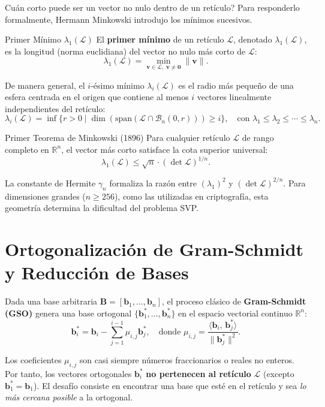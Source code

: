 \documentclass[11pt,a4paper,twoside,openright]{book}
\theoremstyle{plain}
\theoremstyle{definition}
\theoremstyle{remark}
\newcommand{\R}{\mathbb{R}}
\newcommand{\vv}[1]{\mathbf{#1}}
\newcommand{\mm}[1]{\mathbf{#1}}
\newcommand{\inner}[2]{\langle #1,\, #2 \rangle}
\begin{document}
\textquestiondown Cu\'an corto puede ser un vector no nulo dentro de un ret\'iculo? Para responderlo formalmente, Hermann Minkowski introdujo los m\'inimos sucesivos.

\begin{midef}{Primer M\'inimo $\lambda_1(\mathcal{L})$}
El \textbf{primer m\'inimo} de un ret\'iculo $\mathcal{L}$, denotado $\lambda_1(\mathcal{L})$, es la longitud (norma euclidiana) del vector no nulo m\'as corto de $\mathcal{L}$:
\[
  \lambda_1(\mathcal{L}) = \min_{\vv{v} \in \mathcal{L},\; \vv{v} \neq \vv{0}} \|\vv{v}\|.
\]
\end{midef}

De manera general, el $i$-\'esimo m\'inimo $\lambda_i(\mathcal{L})$ es el radio m\'as peque\~no de una esfera centrada en el origen que contiene al menos $i$ vectores linealmente independientes del ret\'iculo:
\[
  \lambda_i(\mathcal{L}) = \inf \{ r > 0 \mid \dim(\mathrm{span}(\mathcal{L} \cap \mathcal{B}_n(0, r))) \geq i \}, \quad \text{con } \lambda_1 \leq \lambda_2 \leq \cdots \leq \lambda_n.
\]

\begin{miteo}{Primer Teorema de Minkowski (1896)}
Para cualquier ret\'iculo $\mathcal{L}$ de rango completo en $\R^n$, el vector m\'as corto satisface la cota superior universal:
\[
  \lambda_1(\mathcal{L}) \leq \sqrt{n} \cdot (\det \mathcal{L})^{1/n}.
\]
\end{miteo}

La constante de Hermite $\gamma_n$ formaliza la raz\'on entre $(\lambda_1)^2$ y $(\det \mathcal{L})^{2/n}$. Para dimensiones grandes ($n \geq 256$), como las utilizadas en criptograf\'ia, esta geometr\'ia determina la dificultad del problema SVP.

\section{Ortogonalizaci\'on de Gram-Schmidt y Reducci\'on de Bases}

Dada una base arbitraria $\mm{B} = [\vv{b}_1, \ldots, \vv{b}_n]$, el proceso cl\'asico de \textbf{Gram-Schmidt (GSO)} genera una base ortogonal $\{\vv{b}_1^*, \ldots, \vv{b}_n^*\}$ en el espacio vectorial continuo $\R^n$:
\[
  \vv{b}_i^* = \vv{b}_i - \sum_{j=1}^{i-1} \mu_{i,j} \vv{b}_j^*, \quad \text{donde } \mu_{i,j} = \frac{\inner{\vv{b}_i}{\vv{b}_j^*}}{\|\vv{b}_j^*\|^2}.
\]

\begin{errorcomun}
Los coeficientes $\mu_{i,j}$ son casi siempre n\'umeros fraccionarios o reales no enteros. Por tanto, los vectores ortogonales $\vv{b}_i^*$ \textbf{no pertenecen al ret\'iculo} $\mathcal{L}$ (excepto $\vv{b}_1^* = \vv{b}_1$). El desaf\'io consiste en encontrar una base que est\'e en el ret\'iculo y sea \emph{lo m\'as cercana posible} a la ortogonal.
\end{errorcomun}
\end{document}
